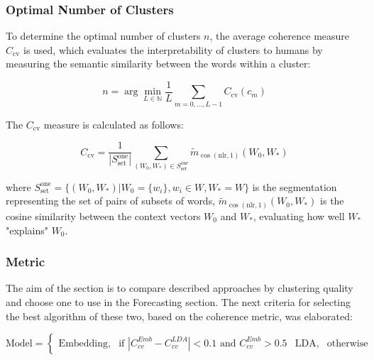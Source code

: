 
\subsubsection{Optimal Number of Clusters}
To determine the optimal number of clusters $n$, the average coherence measure $C_{\text{cv}}$ \cite{roder2015exploring} is used, which evaluates the interpretability of clusters to humans by measuring the semantic similarity between the words within a cluster:

\begin{equation}
n = \arg\min_{L \in \mathbb{N}} \frac{1}{L} \sum_{m=0,...,L-1} C_{\text{cv}}(c_m)
\end{equation}


The $C_{\text{cv}}$ measure is calculated as follows:

\begin{equation}
C_{\text{cv}} = \frac{1}{|S^{\text{one}}_{\text{set}}|} \sum_{(W_0, W_*) \in S^{\text{one}}_{\text{set}}} \tilde{m}_{\cos(\text{nlr}, 1)}(W_0, W_*)
\end{equation}

where  $S^{\text{one}}_{\text{set}} = \{(W_0, W_*) | W_0 = \{w_i\}, w_i \in W, W_* = W\}$ is the segmentation representing the set of pairs of subsets of words, $\tilde{m}_{\cos(\text{nlr}, 1)}(W_0, W_*)$  is the cosine similarity between the context vectors  $W_0$ and $W_*$, evaluating how well $W_*$ "explains" $W_0$.



\subsubsection{Metric}

The aim of the section is to compare described approaches by clustering quality and choose one to use in the Forecasting section.
The next criteria for selecting the best algorithm of these two, based on the coherence metric, was elaborated: 




\begin{equation}
\text{Model} =
\begin{cases}
\text{Embedding},& \text{if } |C_{cv}^{Emb} - C_{cv}^{LDA}| < 0.1 \text{ and } C_{cv}^{Emb} > 0.5 
& \text{LDA},& \text{otherwise}
\end{cases}
\end{equation}

